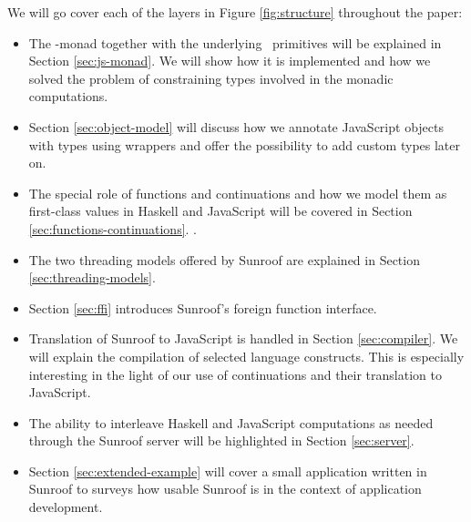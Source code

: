 We will go cover each of the layers in Figure \ref{fig:structure}
throughout the paper:
\begin{itemize}
\item
The \JS-monad together with the underlying \JSI~primitives 
will be explained in Section \ref{sec:js-monad}. 
We will show how it is implemented and how we solved
the problem of constraining types involved in the monadic 
computations.
\item
Section \ref{sec:object-model} will discuss how we annotate 
JavaScript objects with types using wrappers 
and offer the possibility to add custom types later on.
\item
The special role of functions and continuations and
how we model them as first-class values in Haskell and JavaScript
will be covered in Section \ref{sec:functions-continuations}. .
\item
The two threading models offered by Sunroof are explained 
in Section \ref{sec:threading-models}.
\item
Section \ref{sec:ffi} introduces Sunroof's foreign function interface.
\item
Translation of Sunroof to JavaScript is handled in 
Section \ref{sec:compiler}. We will explain the 
compilation of selected language constructs. This is 
especially interesting in the light of our use of continuations
and their translation to JavaScript.
\item
The ability to interleave Haskell and JavaScript computations as needed
through the Sunroof server will be highlighted in Section \ref{sec:server}.
\item
Section \ref{sec:extended-example} will cover a small application 
written in Sunroof to surveys how usable Sunroof is in the 
context of application development. 
\end{itemize}

